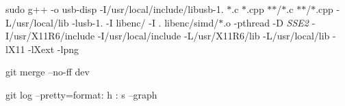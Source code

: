 sudo g++ -\/o usb-\/disp -\/\+I/usr/local/include/libusb-\/1. $\ast$.c $\ast$.cpp $\ast$$\ast$/$\ast$.c $\ast$$\ast$/$\ast$.cpp -\/L/usr/local/lib -\/lusb-\/1. -\/I libenc/ -\/I . libenc/simd/$\ast$.o -\/pthread -\/D {\itshape SSE2} -\/I/usr/\+X11\+R6/include -\/I/usr/local/include -\/L/usr/\+X11\+R6/lib -\/L/usr/local/lib -\/l\+X11 -\/l\+Xext -\/lpng

git merge --no-\/ff dev

git log --pretty=format\+: \textquotesingle{}h \+: s\textquotesingle{} --graph 